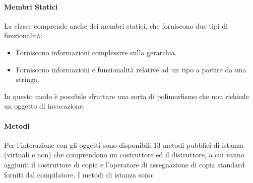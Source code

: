 \paragraph{Membri Statici} %
\label{par:membri_statici}
La classe  comprende anche dei membri statici, che forniscono due tipi di funzionalità:
\begin{itemize}
	\item Forniscono informazioni complessive sulla gerarchia.
	\item Forniscono informazioni e funzionalità relative ad un tipo a partire da una stringa.
\end{itemize}
In questo modo è possibile sfruttare una sorta di polimorfismo che non richiede un oggetto di invocazione.
\paragraph{Metodi} %
\label{par:metodi}
Per l'interazione con gli oggetti sono disponibili $13$ metodi pubblici di istanza (virtuali e non) che comprendono un costruttore ed il distruttore, a cui vanno aggiunti il costruttore di copia e l'operatore di assegnazione di copia standard forniti dal compilatore. I metodi di istanza sono:
